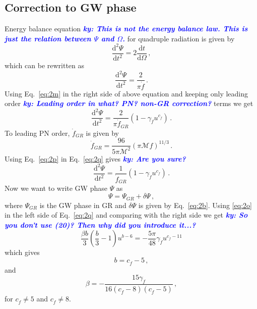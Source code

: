 \documentclass[11pt]{article}
\newcommand{\ky}[1]{\textcolor{blue}{\it{\textbf{ky: #1}}} }
\begin{document}
\subsection{Correction to GW phase}
\hspace{15.5pt}Energy balance equation \ky{This is not the energy balance law. This is just the relation between $\Psi$ and $\Omega$.} for quadruple radiation is given by\cite{Stein:2013wza}
\begin{equation}
\frac{\mathrm{d^2}\Psi}{\mathrm{d} t^2}=2\frac{\mathrm{d} t}{\mathrm{d}\Omega}\,,
\end{equation}
which can be rewritten as
\begin{equation}
\frac{\mathrm{d^2}\Psi}{\mathrm{d} t^2}=\frac{2}{\pi \dot{f}}\,.
\end{equation}
Using Eq.~\eqref{eq:2m} in the right side of above equation and keeping only leading order \ky{Leading order in what? PN? non-GR correction?} terms we get
\begin{equation}\label{eq:2q}
\frac{\mathrm{d^2}\Psi}{\mathrm{d} t^2}=\frac{2}{\pi\dot{f}_{GR}}(1-\gamma_{\dot{f}}u^{c_{\dot{f}}})\,.
\end{equation}
To leading PN order, $\dot{f}_{GR}$ is given by \cite{VanDenBroeck:2006qu}
\begin{equation}\label{eq:2p}
\dot{f}_{GR}=\frac{96}{5\pi\mathcal{M}^2}(\pi \mathcal{M}f)^{11/3}\,.
\end{equation}
Using Eq.~\eqref{eq:2p} in Eq.~\eqref{eq:2q} gives \ky{Are you sure?}
\begin{equation}
\frac{\mathrm{d^2}\Psi}{\mathrm{d} t^2}=\frac{1}{\dot{f}_{GR}}(1-\gamma_{\dot{f}}u^{c_{\dot{f}}})\,.
\end{equation}
Now we want to write GW phase $\Psi$ as 
\begin{equation}\label{eq:2o}
\Psi=\Psi_{GR}+\delta\Psi\,,
\end{equation}
where $\Psi_{GR}$ is the GW phase in GR and $\delta\Psi$ is given by Eq.~\eqref{eq:2b}. Using \eqref{eq:2o} in the left side of Eq.~\eqref{eq:2q} and comparing with the right side we get \ky{So you don't use (20)? Then why did you introduce it...?}
\begin{equation}
\frac{\beta b}{3}\left(\frac{b}{3}-1\right)u^{b-6}=-\frac{5\pi}{48}\gamma_{\dot{f}}u^{c_{\dot{f}}-11}
\end{equation}
which gives
\begin{equation}
b=c_{\dot{f}}-5\,,
\end{equation}
and
\begin{equation}
\beta=-\frac{15 \text{$\gamma_{\dot{f}} $}}{16 (\text{$c_{\dot{f}}$}-8) (\text{$c_{\dot{f}}$}-5)}\,,
\end{equation}
for $c_{\dot{f}} \neq 5$ and $c_{\dot{f}} \neq 8$.
\end{document}
